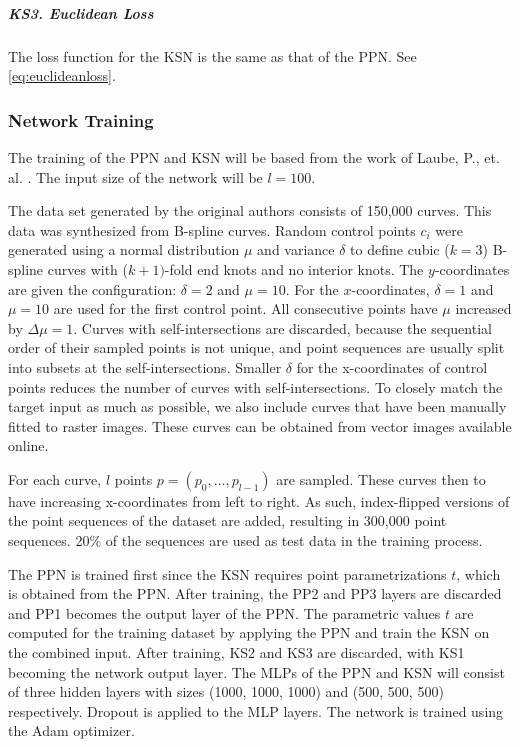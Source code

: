\subparagraph{KS3. Euclidean Loss}
The loss function for the KSN is the same as that of the PPN. See \ref{eq:euclideanloss}.

\subsubsection{Network Training}
The training of the PPN and KSN will be based from the work of Laube, P., et. al. \cite{deeplearningparametrization}. The input size of the network will be $l = 100$.

The data set generated by the original authors consists of 150,000 curves. This data was synthesized from B-spline curves. Random control points $c_{i}$ were generated using a normal distribution $\mu$ and variance $\delta$ to define cubic ($k = 3$) B-spline curves with ($k + 1)$-fold end knots and no interior knots. The $y$-coordinates are given the configuration: $\delta = 2$ and $\mu = 10$. For the $x$-coordinates, $\delta = 1$ and $\mu = 10$ are used for the first control point. All consecutive points have $\mu$ increased by $\Delta\mu = 1$. Curves with self-intersections are discarded, because the sequential order of their sampled points is not unique, and point sequences are usually split into subsets at the self-intersections. Smaller $\delta$ for the x-coordinates of control points reduces the number of curves with self-intersections. To closely match the target input as much as possible, we also include curves that have been manually fitted to raster images. These curves can be obtained from vector images available online.

For each curve, $l$ points $p = (p_{0}, \ldots, p_{l - 1})$ are sampled. These curves then to have increasing x-coordinates from left to right. As such, index-flipped versions of the point sequences of the dataset are added, resulting in 300,000 point sequences. 20\% of the sequences are used as test data in the training process.

The PPN is trained first since the KSN requires point parametrizations $t$, which is obtained from the PPN. After training, the PP2 and PP3 layers are discarded and PP1 becomes the output layer of the PPN. The parametric values $t$ are computed for the training dataset by applying the PPN and train the KSN on the combined input. After training, KS2 and KS3 are discarded, with KS1 becoming the network output layer. The MLPs of the PPN and KSN will consist of three hidden layers with sizes (1000, 1000, 1000) and (500, 500, 500) respectively. Dropout is applied to the MLP layers. The network is trained using the Adam optimizer.

